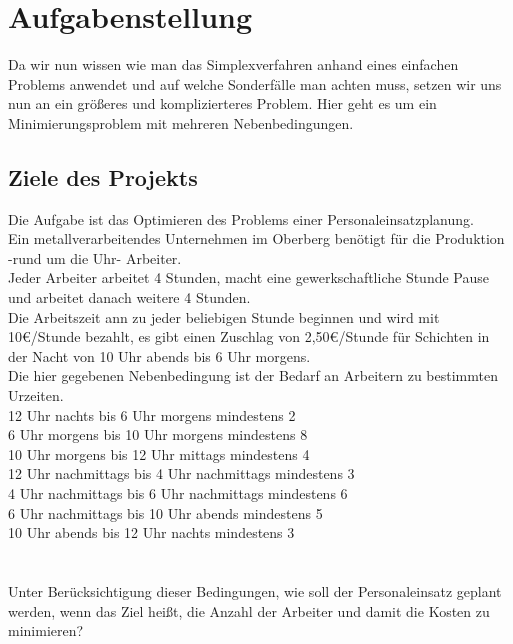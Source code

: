 \section{Aufgabenstellung}
Da wir nun wissen wie man das Simplexverfahren anhand eines einfachen Problems anwendet und auf welche Sonderfälle man achten muss, setzen wir uns nun an ein größeres und komplizierteres Problem. Hier geht es um ein Minimierungsproblem mit mehreren Nebenbedingungen. 
\subsection{Ziele des Projekts}
Die Aufgabe ist das Optimieren des Problems einer Personaleinsatzplanung.\\
Ein metallverarbeitendes Unternehmen im Oberberg benötigt für die Produktion -rund um die Uhr- Arbeiter.\\
Jeder Arbeiter arbeitet 4 Stunden, macht eine gewerkschaftliche Stunde Pause und arbeitet danach weitere 4 Stunden.\\
Die Arbeitszeit ann zu jeder beliebigen Stunde beginnen und wird mit 10€/Stunde bezahlt, es gibt einen Zuschlag von 2,50€/Stunde für Schichten in der Nacht von 10 Uhr abends bis 6 Uhr morgens.\\
Die hier gegebenen Nebenbedingung ist der Bedarf an Arbeitern zu bestimmten Urzeiten.\\
12 Uhr nachts bis 6 Uhr morgens mindestens 2\\
6 Uhr morgens bis 10 Uhr morgens mindestens 8\\
10 Uhr morgens bis 12 Uhr mittags mindestens 4\\
12 Uhr nachmittags bis 4 Uhr nachmittags mindestens 3\\
4 Uhr nachmittags bis 6 Uhr nachmittags mindestens 6\\
6 Uhr nachmittags bis 10 Uhr abends mindestens 5\\
10 Uhr abends bis 12 Uhr nachts mindestens 3\\
\\\\
Unter Berücksichtigung dieser Bedingungen, wie soll der Personaleinsatz geplant werden, wenn das Ziel heißt, die Anzahl der Arbeiter und damit die Kosten zu minimieren?

